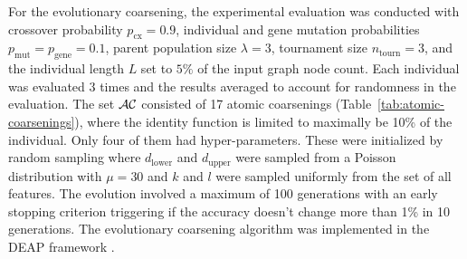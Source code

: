 For the evolutionary coarsening, the experimental evaluation was conducted with crossover probability \( p_\mathrm{cx} = 0.9 \), individual and gene mutation probabilities \( p_\mathrm{mut} = p_\mathrm{gene} = 0.1 \), parent population size \( \lambda = 3 \), tournament size \( n_\mathrm{tourn} = 3 \), and the individual length \( L \) set to \( 5\% \) of the input graph node count. Each individual was evaluated \( 3 \) times and the results averaged to account for randomness in the evaluation. The set \( \mathcal{AC} \) consisted of 17 atomic coarsenings (Table~\ref{tab:atomic-coarsenings}), where the identity function is limited to maximally be 10\% of the individual. Only four of them had hyper-parameters. These were initialized by random sampling where \( d_\mathrm{lower} \) and \( d_\mathrm{upper} \) were sampled from a Poisson distribution with \( \mu = 30 \) and \( k \) and \( l \) were sampled uniformly from the set of all features. The evolution involved a maximum of 100 generations with an early stopping criterion triggering if the accuracy doesn't change more than 1\% in 10 generations. The evolutionary coarsening algorithm was implemented in the DEAP framework \cite{fortin_deap_2012}.

